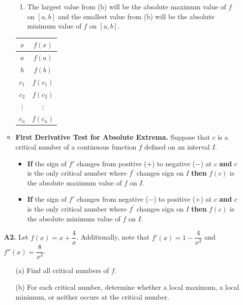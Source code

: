 \documentclass[11pt]{article}
\begin{document}
\begin{enumerate}
\begin{itemize}
\begin{minipage}{0.75\textwidth}
\begin{enumerate}
\item  The largest value from (b)  will be the absolute maximum value of $f$ on $[a, b]$ and the smallest value from (b) will be the absolute minimum value of $f$ on $[a, b]$. 
\end{enumerate}
\end{minipage}
%
\hfill
%
\begin{minipage}{0.2\textwidth}
\begin{center}
\begin{tabular}{|c|c|}
\hline 
$x$ & $f(x)$\tabularnewline
\hline 
\hline 
$a$ & $f(a)$\tabularnewline
\hline 
$b$ & $f(b)$\tabularnewline
\hline 
$c_1$ & $f(c_1)$\tabularnewline
\hline 
$c_2$ & $f(c_2)$\tabularnewline
\hline 
$\vdots$ &$\vdots $\tabularnewline
\hline 
$c_n$ & $f(c_n)$\tabularnewline
\hline 
\end{tabular}
\end{center}
\end{minipage}
\vfill
\item
\textbf{First Derivative Test for Absolute Extrema.}
Suppose that $c$ is a critical number of a continuous function $f$ defined on an interval $I$.
    \begin{itemize}
    \item {\bf If} the sign of $f'$ changes from positive ($+$) to negative ($-$) at $c$ {\bf and} $c$ is the only critical number where $f^{\prime}$ changes sign on $I$
    {\bf then} $f(c)$ is the absolute maximum value of $f$ on $I$.
    \item {\bf If} the sign of $f'$ changes from negative ($-$) to positive ($+$) at $c$ {\bf and} $c$ is the only critical number where $f^{\prime}$ changes sign on $I$
    {\bf then} $f(c)$ is the absolute minimum value of $f$ on $I$.\\
    \end{itemize}
\end{itemize}
\newpage

\item[\textbf{A2.}]
Let $f(x)=x+\dfrac4x$. Additionally, note that $f'(x)=1-\dfrac4{x^2}$ and $f''(x)=\dfrac{8}{x^3}$.
    \begin{itemize}
    \item[(a)] Find all critical numbers of $f$.
        
        \vfill
        \vfill
        
    \item[(b)] For each critical number, determine whether a local maximum, a local minimum, or neither occurs at the critical number.


\end{itemize}
\end{enumerate}
\end{document}
